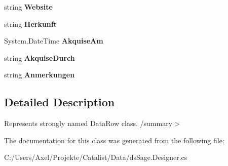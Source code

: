 \begin{DoxyCompactItemize}
\item 
string {\bfseries Website}\hypertarget{class_products_1_1_data_1_1ds_sage_1_1_interessent_row_a6146ba14742e1da6cde64b3ed73a92de}{}\label{class_products_1_1_data_1_1ds_sage_1_1_interessent_row_a6146ba14742e1da6cde64b3ed73a92de}

\item 
string {\bfseries Herkunft}\hypertarget{class_products_1_1_data_1_1ds_sage_1_1_interessent_row_ace9bbc851773a3245395dd70e8b9b569}{}\label{class_products_1_1_data_1_1ds_sage_1_1_interessent_row_ace9bbc851773a3245395dd70e8b9b569}

\item 
System.\+Date\+Time {\bfseries Akquise\+Am}\hypertarget{class_products_1_1_data_1_1ds_sage_1_1_interessent_row_a4cbc97d2e736ec395efe83947b4f44d1}{}\label{class_products_1_1_data_1_1ds_sage_1_1_interessent_row_a4cbc97d2e736ec395efe83947b4f44d1}

\item 
string {\bfseries Akquise\+Durch}\hypertarget{class_products_1_1_data_1_1ds_sage_1_1_interessent_row_afa908fc949926a1b631a02a03cec9947}{}\label{class_products_1_1_data_1_1ds_sage_1_1_interessent_row_afa908fc949926a1b631a02a03cec9947}

\item 
string {\bfseries Anmerkungen}\hypertarget{class_products_1_1_data_1_1ds_sage_1_1_interessent_row_a29e5f60579915d0b86486a8d1d54dbab}{}\label{class_products_1_1_data_1_1ds_sage_1_1_interessent_row_a29e5f60579915d0b86486a8d1d54dbab}

\end{DoxyCompactItemize}


\subsection{Detailed Description}
Represents strongly named Data\+Row class. /summary$>$ 

The documentation for this class was generated from the following file\+:\begin{DoxyCompactItemize}
\item 
C\+:/\+Users/\+Axel/\+Projekte/\+Catalist/\+Data/ds\+Sage.\+Designer.\+cs\end{DoxyCompactItemize}
